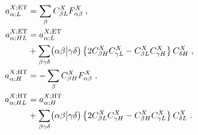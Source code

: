\begin{subequations}\label{e:a:aoep}
\begin{align}
%
a_{\alpha;L}^{X;{\rm ET}} &= \sum_\beta C_{\beta L}^X F_{\alpha\beta}^X \;,\\
%
a_{\alpha;HL}^{X;{\rm ET}} &= a_{\alpha;L}^{X;{\rm ET}} \nonumber \\
 &+\sum_{\beta\gamma\delta} \braket{\alpha\beta}{\gamma\delta}
 \left\{ 2C^X_{\beta  H} C^X_{\gamma L} - C^X_{\beta  L} C^X_{\gamma H}\right\} C^X_{\delta H} \;,\\
%
a_{\alpha;H}^{X;{\rm HT}} &=-\sum_\beta C_{\beta H}^X F_{\alpha\beta}^X \;,\\
%
a_{\alpha;HL}^{X;{\rm HT}} &=a_{\alpha;H}^{X;{\rm HT}} \nonumber \\
 &+\sum_{\beta\gamma\delta} \braket{\alpha\beta}{\gamma\delta}
 \left\{ 2C^X_{\beta  L} C^X_{\gamma H} - C^X_{\beta  H} C^X_{\gamma L}\right\} C^X_{\delta L} \;.
%
\end{align}
\end{subequations}
